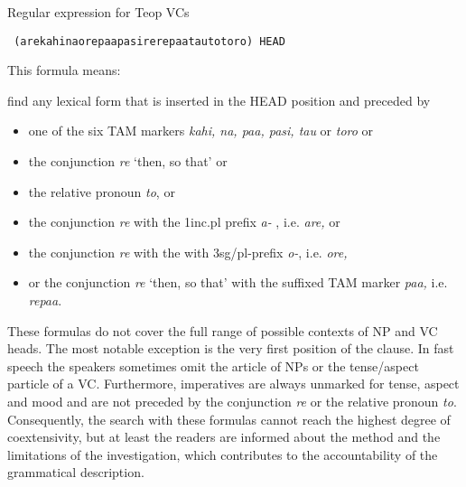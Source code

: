\ea \label{ex:m4} Regular expression for Teop VCs

\texttt{
{\regexB}(are{\textbar}kahi{\textbar}na{\textbar}ore{\textbar}paa{\textbar}pasi{\textbar}re{\textbar}repaa{\textbar}tau{\textbar}to{\textbar}toro){\regexB} {\regexB}HEAD{\regexB}
}

\z

This formula means:


\ea \label{ex:m5} find any lexical form that is inserted in the HEAD position and preceded by

\begin{itemize}
\item {one of the six TAM markers \textit{kahi, na, paa, pasi, tau }or \textit{toro} or }
\item {the conjunction \textit{re} `then, so that' or }
\item {the relative pronoun \textit{to}, or }
\item {the conjunction \textit{re} with the 1inc.pl prefix \textit{a-} , i.e. \textit{are, }or  }
\item {the conjunction \textit{re} with the with 3sg/pl-prefix \textit{o-}, i.e. \textit{ore,} }
\item {or the conjunction \textit{re} `then, so that' with\textit{ }the suffixed TAM marker \textit{paa, }i.e. \textit{repaa}.%
}
\end{itemize}
\z

These formulas do not cover the full range of possible contexts of NP and VC heads. The most notable exception is the very first position of the clause. In fast speech the speakers sometimes omit the article of NPs or the tense/aspect particle of a VC. Furthermore, imperatives are always unmarked for tense, aspect and mood and are not preceded by the conjunction \textit{re} or the relative pronoun \textit{to}. Consequently, the search with these formulas cannot reach the highest degree of coextensivity, but at least the readers are informed about the method and the limitations of the investigation, which contributes to the accountability of the grammatical description. 


